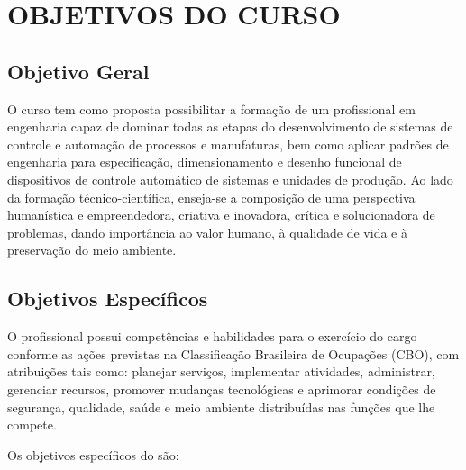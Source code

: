 \clearpage\section{OBJETIVOS DO CURSO}
\label{OBJETIVOS}

\subsection{Objetivo Geral}

O curso tem como proposta possibilitar a formação de um profissional em engenharia capaz de dominar todas as etapas do desenvolvimento de sistemas de controle e automação de processos e manufaturas, bem como aplicar padrões de engenharia para especificação, dimensionamento e desenho funcional de dispositivos de controle automático de sistemas e unidades de produção. Ao lado da formação técnico-científica, enseja-se a composição de uma perspectiva humanística e empreendedora, criativa e inovadora, crítica e solucionadora de problemas, dando importância ao valor humano, à qualidade de vida e à preservação do meio ambiente.

\subsection{Objetivos Específicos}

O profissional \NOMEEGRESSO possui competências e habilidades para o exercício do cargo conforme as ações previstas na Classificação Brasileira de Ocupações (CBO), com atribuições tais como: planejar serviços, implementar atividades, administrar, gerenciar recursos, promover mudanças tecnológicas e aprimorar condições de segurança, qualidade, saúde e meio ambiente distribuídas nas funções que lhe compete.

Os objetivos específicos do \NOMECURSO são:

